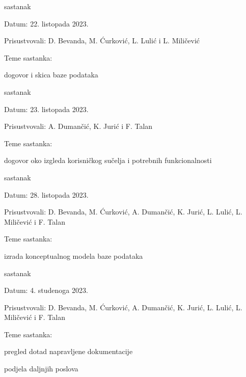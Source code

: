 \begin{packed_enum}
            \item  sastanak
			\item[] \begin{packed_item}
				\item Datum: 22. listopada 2023.
				\item Prisustvovali: D. Bevanda, M. Ćurković, L. Lulić i L. Miličević 
				\item Teme sastanka:
				\begin{packed_item}
					\item  dogovor i skica baze podataka
				\end{packed_item}
			\end{packed_item}

            \item  sastanak
			\item[] \begin{packed_item}
				\item Datum: 23. listopada 2023.
				\item Prisustvovali: A. Dumančić, K. Jurić i F. Talan
				\item Teme sastanka:
				\begin{packed_item}
					\item  dogovor oko izgleda korisničkog sučelja i potrebnih funkcionalnosti
				\end{packed_item}
			\end{packed_item}

            \item  sastanak
			\item[] \begin{packed_item}
				\item Datum: 28. listopada 2023.
				\item Prisustvovali: D. Bevanda, M. Ćurković, A. Dumančić, K. Jurić, L. Lulić, L. Miličević i F. Talan
				\item Teme sastanka:
				\begin{packed_item}
					\item  izrada konceptualnog modela baze podataka
				\end{packed_item}
			\end{packed_item}

			\item  sastanak
			\item[] \begin{packed_item}
				\item Datum: 4. studenoga 2023.
				\item Prisustvovali: D. Bevanda, M. Ćurković, A. Dumančić, K. Jurić, L. Lulić, L. Miličević i F. Talan
				\item Teme sastanka:
				\begin{packed_item}
					\item  pregled dotad napravljene dokumentacije
                    \item  podjela daljnjih poslova
				\end{packed_item}
			\end{packed_item}


\end{packed_enum}
